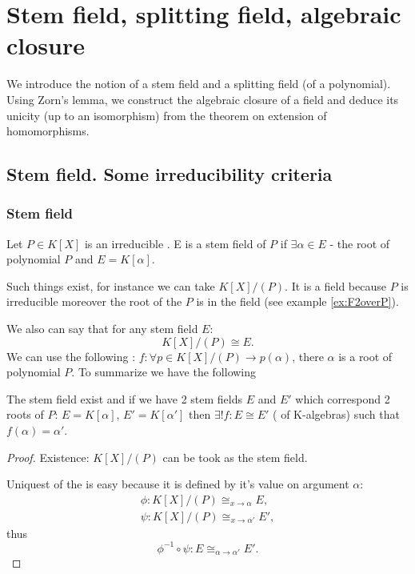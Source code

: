 \chapter{Stem field, splitting field, algebraic closure}
We introduce the notion of a stem field and a splitting field (of a
polynomial). Using Zorn's lemma, we construct the algebraic closure of
a field and deduce its unicity (up to an isomorphism) from the theorem
on extension of homomorphisms.

\section{Stem field. Some irreducibility criteria}

\subsection{Stem field}

\begin{definition}
Let $P \in K\left[X\right]$ is an irreducible
.  E is a stem
field of $P$ if $\exists \alpha \in E$ - the root of polynomial
$P$ and $E = K\left[\alpha\right]$.
\label{def:stemfield}
\end{definition}

Such things exist, for instance we can take
$K\left[X\right]/\left(P\right)$. It is a field because $P$ is
irreducible moreover the root of the $P$ is in the field (see example
\ref{ex:F2overP}).

We also can say that for any stem field $E$:
\[
K\left[X\right]/\left(P\right) \cong E.
\]
We can use the following :
$f: \forall p \in K\left[X\right]/\left(P\right) \rightarrow
p(\alpha)$, there $\alpha$ is a root of polynomial $P$.
To summarize we have the following
\begin{proposition}
  The stem field exist and if we have 2 stem fields $E$ and $E'$ which
  correspond 2 roots of $P$: $E = K\left[\alpha\right]$,
  $E' = K\left[\alpha'\right]$ then $\exists! f: E \cong E'$
  ( of K-algebras) such that $f(\alpha) =
  \alpha'$. 
  \begin{proof}
    Existence: $K\left[X\right]/\left(P\right)$ can be took as the
    stem field.

    Uniquest of the  is easy because it is
    defined by it's value on argument $\alpha$:
    \begin{eqnarray}
      \phi: K\left[X\right]/\left(P\right) \cong_{x \to \alpha} E,
      \nonumber \\
      \psi: K\left[X\right]/\left(P\right) \cong_{x \to \alpha'} E',
      \nonumber
    \end{eqnarray}
    thus
    \[
    \phi^{-1} \circ \psi: E \cong_{\alpha \to \alpha'} E'.
    \]
  \end{proof}
  \label{prop:stemfield}
\end{proposition}

